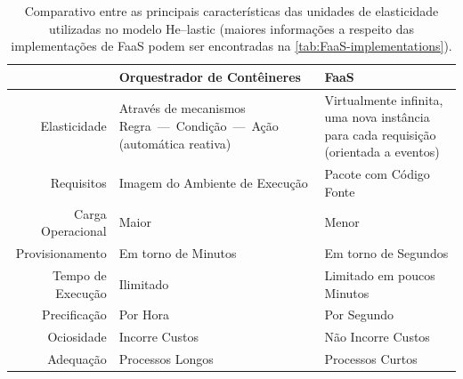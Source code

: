 \documentclass[english,brazilian]{UNISINOSmonografia} %
\newcommand\defaultFigureWidth{0.9}
\renewcommand{\arraystretch}{1.3}
\begin{document}
\begin{table}[tb]
\centering%
\begin{minipage}{\defaultFigureWidth\textwidth}
	\caption[Comparativo entre as principais características das unidades de elasticidade utilizadas no modelo \textsf{He}--lastic.]{Comparativo entre as principais características das unidades de elasticidade utilizadas no modelo \textsf{He}--lastic (maiores informações a respeito das implementações de FaaS podem ser encontradas na \autoref{tab:FaaS-implementations}).}
	\label{tab:modelo-elasticidade-comparacao}
	\small
	\vspace{1ex}
	\renewcommand\arraystretch{1.4}
	\renewcommand {\tabularxcolumn}[1]{>{\arraybackslash}m{#1}} %
	\begin{tabularx}{\textwidth}{@{}rXX}
		\toprule
		& Orquestrador de Contêineres & FaaS \\ 
		\midrule
		Elasticidade & Através de mecanismos \newline Regra~---~Condição~---~Ação \newline (automática reativa) & Virtualmente infinita, uma nova instância para cada requisição \newline (orientada a eventos) \\
		Requisitos & Imagem do Ambiente \newline de Execução & Pacote com Código Fonte \\
		Carga Operacional & Maior & Menor \\
		Provisionamento & Em torno de Minutos & Em torno de Segundos \\
		Tempo de Execução & Ilimitado & Limitado em poucos Minutos \\
		Precificação & Por Hora & Por Segundo \\
		Ociosidade & Incorre Custos & Não Incorre Custos \\
		Adequação & Processos Longos & Processos Curtos \\ 
		\bottomrule
	\end{tabularx}
\end{minipage}
\end{table}
\end{document}

